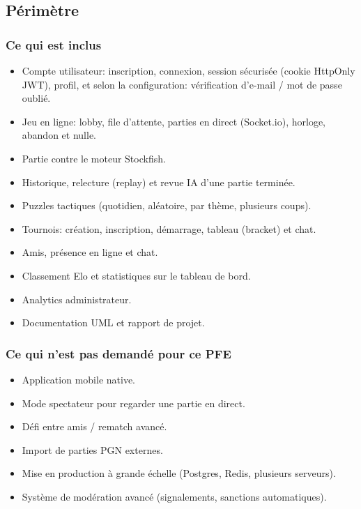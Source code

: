 \documentclass[12pt,a4paper,oneside]{article}
\begin{document}
\subsection{Périmètre}

\subsubsection{Ce qui est inclus}
\begin{itemize}
  \item Compte utilisateur: inscription, connexion, session sécurisée (cookie HttpOnly JWT), profil, et selon la configuration: vérification d'e-mail / mot de passe oublié.
  \item Jeu en ligne: lobby, file d'attente, parties en direct (Socket.io), horloge, abandon et nulle.
  \item Partie contre le moteur Stockfish.
  \item Historique, relecture (replay) et revue IA d'une partie terminée.
  \item Puzzles tactiques (quotidien, aléatoire, par thème, plusieurs coups).
  \item Tournois: création, inscription, démarrage, tableau (bracket) et chat.
  \item Amis, présence en ligne et chat.
  \item Classement Elo et statistiques sur le tableau de bord.
  \item Analytics administrateur.
  \item Documentation UML et rapport de projet.
\end{itemize}

\subsubsection{Ce qui n'est pas demandé pour ce PFE}
\begin{itemize}
  \item Application mobile native.
  \item Mode spectateur pour regarder une partie en direct.
  \item Défi entre amis / rematch avancé.
  \item Import de parties PGN externes.
  \item Mise en production à grande échelle (Postgres, Redis, plusieurs serveurs).
  \item Système de modération avancé (signalements, sanctions automatiques).
\end{itemize}
\end{document}
